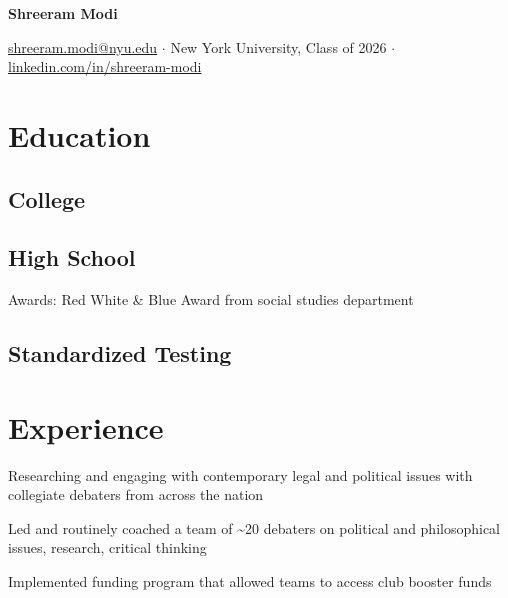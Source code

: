 \documentclass[letterpaper]{resume-shreeram}
\begin{document}
\begin{center}
  {\Huge \bfseries Shreeram Modi}

  \href{mailto:shreeram.modi@nyu.edu}{shreeram.modi@nyu.edu}
  $\cdot$
  New York University, Class of 2026
  $\cdot$
  \href{https://linkedin.com/in/shreeram-modi}{linkedin.com/in/shreeram-modi}
\end{center}

\section{Education}

\subsection{College}


\subsection{High School}

\begin{compactitem}
  \item Awards: Red White \& Blue Award from social studies department
\end{compactitem}

\subsection{Standardized Testing}


\section{Experience}

\begin{compactitem}
  \item Researching and engaging with contemporary legal and political
    issues with collegiate debaters from across the nation
\end{compactitem}

\begin{compactitem}
    \item Led and routinely coached a team of \textasciitilde{}20 debaters on
      political and philosophical issues, research, critical thinking

    \item Implemented funding program that allowed teams to access club booster
      funds
\end{compactitem}
\end{document}
